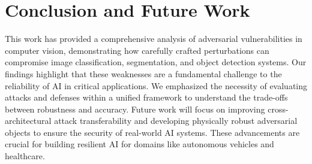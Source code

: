 \documentclass[conference]{IEEEtran}
\begin{document}
\section{Conclusion and Future Work}
This work has provided a comprehensive analysis of adversarial vulnerabilities in computer vision, demonstrating how carefully crafted perturbations can compromise image classification, segmentation, and object detection systems. Our findings highlight that these weaknesses are a fundamental challenge to the reliability of AI in critical applications. We emphasized the necessity of evaluating attacks and defenses within a unified framework to understand the trade-offs between robustness and accuracy. Future work will focus on improving cross-architectural attack transferability and developing physically robust adversarial objects to ensure the security of real-world AI systems. These advancements are crucial for building resilient AI for domains like autonomous vehicles and healthcare.






\end{document}
